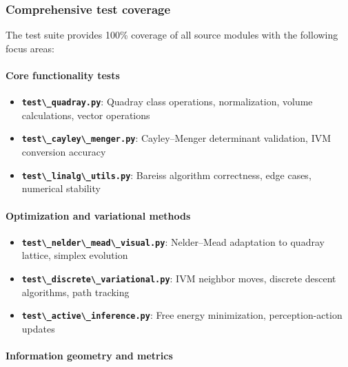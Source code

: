 \documentclass[
  10pt,
]{article}
\newcommand{\passthrough}[1]{#1}
\providecommand{\tightlist}{%
  \setlength{\itemsep}{0pt}\setlength{\parskip}{0pt}}
\begin{document}
\subsubsection{Comprehensive test
coverage}\label{comprehensive-test-coverage}

The test suite provides 100\% coverage of all source modules with the
following focus areas:

\paragraph{Core functionality tests}\label{core-functionality-tests}

\begin{itemize}
\tightlist
\item
  \textbf{\passthrough{\lstinline!test\_quadray.py!}}: Quadray class
  operations, normalization, volume calculations, vector operations
\item
  \textbf{\passthrough{\lstinline!test\_cayley\_menger.py!}}:
  Cayley--Menger determinant validation, IVM conversion accuracy
\item
  \textbf{\passthrough{\lstinline!test\_linalg\_utils.py!}}: Bareiss
  algorithm correctness, edge cases, numerical stability
\end{itemize}

\paragraph{Optimization and variational
methods}\label{optimization-and-variational-methods}

\begin{itemize}
\tightlist
\item
  \textbf{\passthrough{\lstinline!test\_nelder\_mead\_visual.py!}}:
  Nelder--Mead adaptation to quadray lattice, simplex evolution
\item
  \textbf{\passthrough{\lstinline!test\_discrete\_variational.py!}}: IVM
  neighbor moves, discrete descent algorithms, path tracking
\item
  \textbf{\passthrough{\lstinline!test\_active\_inference.py!}}: Free
  energy minimization, perception-action updates
\end{itemize}

\paragraph{Information geometry and
metrics}\label{information-geometry-and-metrics}
\end{document}
